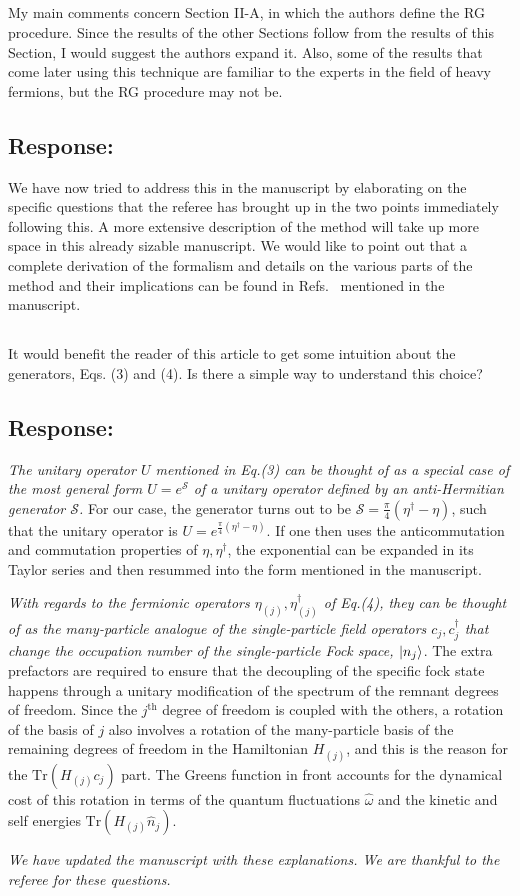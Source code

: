 \documentclass{article}
\newcommand{\response}[1]{{\color{blue}\subsection*{Response:}{#1}}}
\newcommand{\point}[1]{\subsection{}{#1}}
\begin{document}
\point{
My main comments concern Section II-A, in which the authors define the RG procedure. Since the results of the other Sections follow from the results of this Section, I would suggest the authors expand it. Also, some of the results that come later using this technique are familiar to the experts in the field of heavy fermions, but the RG procedure may not be.}

\response{We have now tried to address this in the manuscript by elaborating on the specific questions that the referee has brought up in the two points immediately following this. A more extensive description of the method will take up more space in this already sizable manuscript. We would like to point out that a complete derivation of the formalism and details on the various parts of the method and their implications can be found in Refs.~\cite{anirbanurg1,anirbanurg2} mentioned in the manuscript.}


\point{
It would benefit the reader of this article to get some intuition about the generators, Eqs. (3) and (4). Is there a simple way to understand this choice?}

\response{
	{\it The unitary operator \(U\) mentioned in Eq.(3) can be thought of as a special case of the most general form \(U = e^\mathcal{S}\) of a unitary operator defined by an anti-Hermitian generator \(\mathcal{S}\).} For our case, the generator turns out to be \(\mathcal{S} = \frac{\pi}{4}\left( \eta^\dagger - \eta \right) \), such that the unitary operator is \(U = e^{\frac{\pi}{4}\left(\eta^\dagger - \eta\right) }\). If one then uses the anticommutation and commutation properties of \(\eta,\eta^\dagger\), the exponential can be expanded in its Taylor series and then resummed into the form mentioned in the manuscript.

	{\it With regards to the fermionic operators \(\eta_{(j)},\eta^\dagger_{(j)}\) of Eq.(4), they can be thought of as the many-particle analogue of the single-particle field operators \(c_j,c^\dagger_j\) that change the occupation number of the single-particle Fock space, \(\ket{n_j}\)}. The extra prefactors are required to ensure that the decoupling of the specific fock state happens through a unitary modification of the spectrum of the remnant degrees of freedom. Since the \(j^\text{th}\) degree of freedom is coupled with the others, a rotation of the basis of \(j\) also involves a rotation of the many-particle basis of the remaining degrees of freedom in the Hamiltonian \(H_{(j)}\), and this is the reason for the \(\text{Tr}\left(H_(j) c_j\right) \) part. The Greens function in front accounts for the dynamical cost of this rotation in terms of the quantum fluctuations \(\hat \omega\) and the kinetic and self energies \(\text{Tr}\left( H_{(j)}\hat n_j \right) \).

	{\it We have updated the manuscript with these explanations. We are thankful to the referee for these questions.}
}
\end{document}
